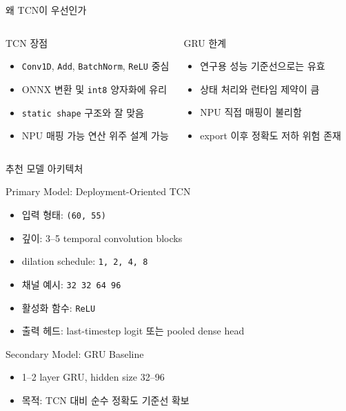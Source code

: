 \documentclass[aspectratio=169]{beamer}
\begin{document}
\begin{frame}{왜 TCN이 우선인가}
  \begin{columns}[T]
    \begin{block}{TCN 장점}
      \begin{itemize}
        \item \texttt{Conv1D}, \texttt{Add}, \texttt{BatchNorm}, \texttt{ReLU} 중심
        \item ONNX 변환 및 \texttt{int8} 양자화에 유리
        \item \texttt{static shape} 구조와 잘 맞음
        \item NPU 매핑 가능 연산 위주 설계 가능
      \end{itemize}
    \end{block}

    \begin{block}{GRU 한계}
      \begin{itemize}
        \item 연구용 성능 기준선으로는 유효
        \item 상태 처리와 런타임 제약이 큼
        \item NPU 직접 매핑이 불리함
        \item export 이후 정확도 저하 위험 존재
      \end{itemize}
    \end{block}
  \end{columns}
\end{frame}

\begin{frame}{추천 모델 아키텍처}
  \begin{block}{Primary Model: Deployment-Oriented TCN}
    \begin{itemize}
      \item 입력 형태: \texttt{(60, 55)}
      \item 깊이: 3--5 temporal convolution blocks
      \item dilation schedule: \texttt{1, 2, 4, 8}
      \item 채널 예시: \texttt{32 \textrightarrow{} 32 \textrightarrow{} 64 \textrightarrow{} 96}
      \item 활성화 함수: \texttt{ReLU}
      \item 출력 헤드: last-timestep logit 또는 pooled dense head
    \end{itemize}
  \end{block}

  \begin{block}{Secondary Model: GRU Baseline}
    \begin{itemize}
      \item 1--2 layer GRU, hidden size 32--96
      \item 목적: TCN 대비 순수 정확도 기준선 확보
    \end{itemize}
  \end{block}
\end{frame}
\end{document}

